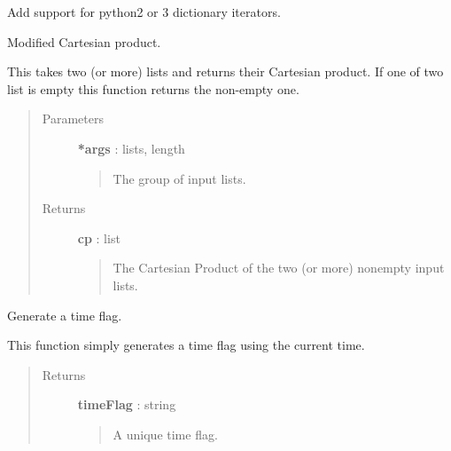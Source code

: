 \documentclass[letterpaper,10pt,english]{sphinxmanual}
\begin{document}
\begin{fulllineitems}
\label{index:adenine.utils.extra.items_iterator}
Add support for python2 or 3 dictionary iterators.

\end{fulllineitems}


\begin{fulllineitems}
\label{index:adenine.utils.extra.modified_cartesian}
Modified Cartesian product.

This takes two (or more) lists and returns their Cartesian product.
If one of two list is empty this function returns the non-empty one.
\begin{quote}\begin{description}
\item[{Parameters}] \leavevmode
\textbf{*args} : lists, length
\begin{quote}

The group of input lists.
\end{quote}

\item[{Returns}] \leavevmode
\textbf{cp} : list
\begin{quote}

The Cartesian Product of the two (or more) nonempty input lists.
\end{quote}

\end{description}\end{quote}

\end{fulllineitems}


\begin{fulllineitems}
\label{index:adenine.utils.extra.make_time_flag}
Generate a time flag.

This function simply generates a time flag using the current time.
\begin{quote}\begin{description}
\item[{Returns}] \leavevmode
\textbf{timeFlag} : string
\begin{quote}

A unique time flag.
\end{quote}

\end{description}\end{quote}

\end{fulllineitems}
\end{document}
